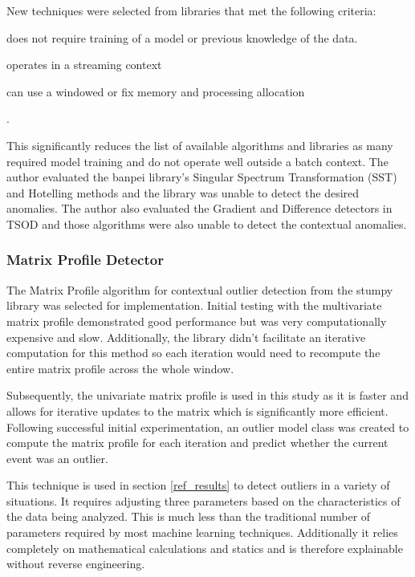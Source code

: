 New techniques were selected from libraries that met the following criteria:
\begin{inlinelist}
    \item does not require training of a model or previous knowledge of the data.
    \item operates in a streaming context
    \item can use a windowed or fix memory and processing allocation
\end{inlinelist}. 

This significantly reduces the list of available algorithms and libraries as many required model training and do not operate well outside a batch context. The author evaluated the banpei \parencite{banpei} library's Singular Spectrum Transformation (SST) and Hotelling methods and the library was unable to detect the desired anomalies. The author also evaluated the Gradient and Difference detectors in TSOD \parencite{tsod} and those algorithms were also unable to detect the contextual anomalies.

\subsubsection{Matrix Profile Detector}

The Matrix Profile algorithm for contextual outlier detection from the stumpy library \parencite{law2019stumpy} was selected for implementation. Initial testing with the multivariate matrix profile demonstrated good performance but was very computationally expensive and slow. Additionally, the library didn't facilitate an iterative computation for this method so each iteration would need to recompute the entire matrix profile across the whole window.

Subsequently, the univariate matrix profile is used in this study as it is faster and allows for iterative updates to the matrix which is significantly more efficient. Following successful initial experimentation, an outlier model class was created to compute the matrix profile for each iteration and predict whether the current event was an outlier. 

This technique is used in section \ref{ref_results} to detect outliers in a variety of situations. It requires adjusting three parameters based on the characteristics of the data being analyzed. This is much less than the traditional number of parameters required by most machine learning techniques. Additionally it relies completely on mathematical calculations and statics and is therefore explainable without reverse engineering. 

